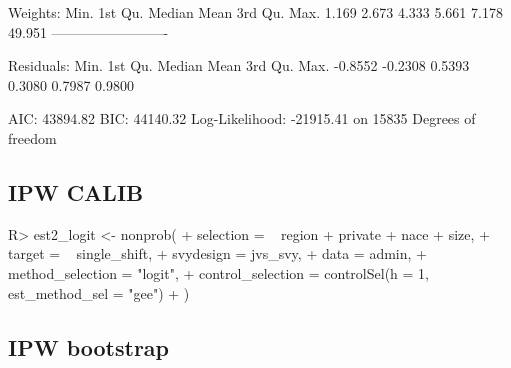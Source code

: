 \documentclass[
]{jss}
\begin{document}
\begin{CodeChunk}
\begin{CodeOutput}
Weights:
   Min. 1st Qu.  Median    Mean 3rd Qu.    Max. 
  1.169   2.673   4.333   5.661   7.178  49.951 
-------------------------

Residuals:
   Min. 1st Qu.  Median    Mean 3rd Qu.    Max. 
-0.8552 -0.2308  0.5393  0.3080  0.7987  0.9800 

AIC: 43894.82
BIC: 44140.32
Log-Likelihood: -21915.41 on 15835 Degrees of freedom
\end{CodeOutput}
\end{CodeChunk}

\subsection{IPW CALIB}\label{ipw-calib}

\begin{CodeChunk}
\begin{CodeInput}
R> est2_logit <- nonprob(
+   selection = ~ region + private + nace + size,
+   target = ~ single_shift,
+   svydesign = jvs_svy,
+   data = admin,
+   method_selection = "logit",
+   control_selection = controlSel(h = 1, est_method_sel = "gee")
+ )
\end{CodeInput}
\end{CodeChunk}

\subsection{IPW bootstrap}\label{ipw-bootstrap}
\end{document}
